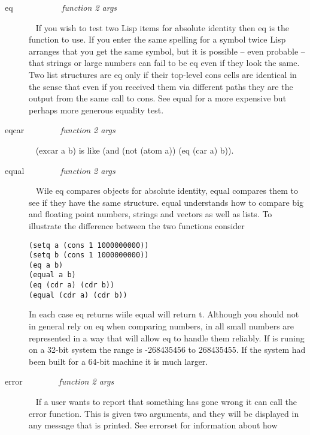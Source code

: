 \begin{description}
\item[{\tx eq~~~~~~~~~~~} \hspace{1cm} {\em function 2 args}]~\newline
If you wish to test two Lisp items for absolute identity then {\tx eq} is the
function to use. If you enter the same spelling for a symbol twice Lisp arranges
that you get the same symbol, but it is possible -- even probable -- that strings
or large numbers can fail to be {\tx eq} even if they look the same. Two list
structures are {\tx eq} only if their top-level {\tx cons} cells are identical
in the sense that even if you received them via different paths they are the
output from the same call to {\tx cons}. See {\tx equal} for a more
expensive but perhaps more generous equality test.
\item[{\tx eqcar~~~~~~~~} \hspace{1cm} {\em function 2 args}]~\newline
{\tx (excar a b)} is like {\tx (and (not (atom a)) (eq (car a) b))}.
\item[{\tx equal~~~~~~~~} \hspace{1cm} {\em function 2 args}]~\newline
Wile {\tx eq} compares objects for absolute identity, {\tx equal} compares
them to see if they have the same structure. {\tx equal} understands how to
compare big and floating point numbers, strings and vectors as well as
lists. To illustrate the difference between the two functions consider
{\begin{verbatim}
(setq a (cons 1 1000000000))
(setq b (cons 1 1000000000))
(eq a b)
(equal a b)
(eq (cdr a) (cdr b))
(equal (cdr a) (cdr b))
\end{verbatim}}
In each case {\tx eq} returns \nil{} wiile {\tx equal} will return  {\tx t}.
Although you should not in general rely on {\tx eq} when comparing numbers,
in \vsl{} all small numbers are represented in a way that will allow {\tx eq}
to handle them reliably. If \vsl{} is runing on a 32-bit system the
range is -268435456 to 268435455. If the system had been built for a 64-bit
machine it is much larger.
\item[{\tx error~~~~~~~~} \hspace{1cm} {\em function 2 args}]~\newline
If a user wants to report that something has gone wrong it can call the
{\tx error} function. This is given two arguments, and they will be displayed
in any message that is printed. See {\tx errorset} for information about how

\end{description}
